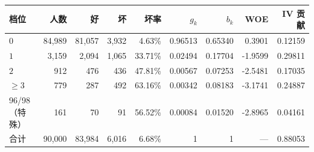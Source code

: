 \begin{tabular}{lrrrrrrrr}
\toprule
档位 & 人数 & 好 & 坏 & 坏率 & $g_k$ & $b_k$ & WOE & IV 贡献 \\
\midrule
$0$ & 84,989 & 81,057 & 3,932 & 4.63\% & 0.96513 & 0.65340 & 0.3901 & 0.12159 \\
$1$ & 3,159 & 2,094 & 1,065 & 33.71\% & 0.02494 & 0.17704 & -1.9599 & 0.29811 \\
$2$ & 912 & 476 & 436 & 47.81\% & 0.00567 & 0.07253 & -2.5481 & 0.17035 \\
$\geq 3$ & 779 & 287 & 492 & 63.16\% & 0.00342 & 0.08183 & -3.1741 & 0.24887 \\
96/98（特殊） & 161 & 70 & 91 & 56.52\% & 0.00084 & 0.01520 & -2.8965 & 0.04161 \\
\midrule
合计 & 90,000 & 83,984 & 6,016 & 6.68\% & 1 & 1 & --- & 0.88053 \\
\bottomrule
\end{tabular}
